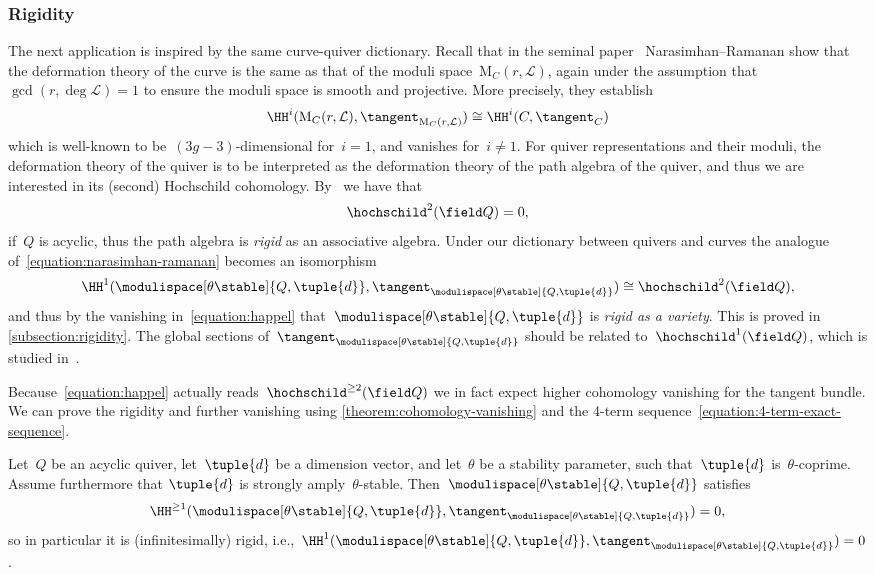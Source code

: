 \subsubsection*{Rigidity}
The next application is inspired by the same curve-quiver dictionary.
Recall that in the seminal paper~\cite{MR0384797} Narasimhan--Ramanan show
that the deformation theory of the curve
is the same as that of the moduli space~$\mathrm{M}_C(r,\mathcal{L})$,
again under the assumption that~$\gcd(r,\deg\mathcal{L})=1$ to ensure the moduli space is smooth and projective.
More precisely,
they establish
\begin{equation}
\label{equation:narasimhan-ramanan}
\HH^i(\mathrm{M}_C(r,\mathcal{L}),\tangent_{\mathrm{M}_C(r,\mathcal{L})})
\cong
\HH^i(C,\tangent_C)
\end{equation}
which is well-known to be~$(3g-3)$-dimensional for~$i=1$,
and vanishes for~$i\neq 1$.
For quiver representations and their moduli,
the deformation theory of the quiver
is to be interpreted as the deformation theory of the path algebra of the quiver,
and thus we are interested in its (second) Hochschild cohomology.
By~\cite[\S1.6]{MR1035222} we have that
\begin{equation}
\label{equation:happel}
\hochschild^2(\field Q)=0,
\end{equation}
if~$Q$ is acyclic,
thus the path algebra is \emph{rigid} as an associative algebra.
Under our dictionary between quivers and curves
the analogue of~\eqref{equation:narasimhan-ramanan}
becomes an isomorphism
\begin{equation*}
\HH^1(\modulispace[\theta\stable]{Q,\tuple{d}},\tangent_{\modulispace[\theta\stable]{Q,\tuple{d}}})
\cong
\hochschild^2(\field Q),
\end{equation*}
and thus by the vanishing in~\eqref{equation:happel}
that~$\modulispace[\theta\stable]{Q,\tuple{d}}$
is \emph{rigid as a variety}.
This is proved in \cref{subsection:rigidity}.
The global sections of~$\tangent_{\modulispace[\theta\stable]{Q,\tuple{d}}}$
should be related to~$\hochschild^1(\field Q)$,
which is studied in~\cite{MR4883104}.

Because~\eqref{equation:happel} actually reads~$\hochschild^{\geq 2}(\field Q)$
we in fact expect higher cohomology vanishing for the tangent bundle.
We can prove the rigidity and further vanishing using \cref{theorem:cohomology-vanishing}
and the 4-term sequence~\eqref{equation:4-term-exact-sequence}.

\begin{alphacorollary}
\label{corollary:rigidity}
Let~$Q$ be an acyclic quiver,
let~$\tuple{d}$ be a dimension vector,
and let~$\theta$ be a stability parameter,
such that~$\tuple{d}$ is~$\theta$-coprime.
Assume furthermore that $\tuple{d}$ is strongly amply~$\theta$-stable.
Then~$\modulispace[\theta\stable]{Q,\tuple{d}}$ satisfies
\begin{equation*}
\HH^{\geq 1}(\modulispace[\theta\stable]{Q,\tuple{d}},\tangent_{\modulispace[\theta\stable]{Q,\tuple{d}}})=0,
\end{equation*}
so in particular it is (infinitesimally) rigid,
i.e.,~$\HH^1(\modulispace[\theta\stable]{Q,\tuple{d}},\tangent_{\modulispace[\theta\stable]{Q,\tuple{d}}})=0$.
\end{alphacorollary}

